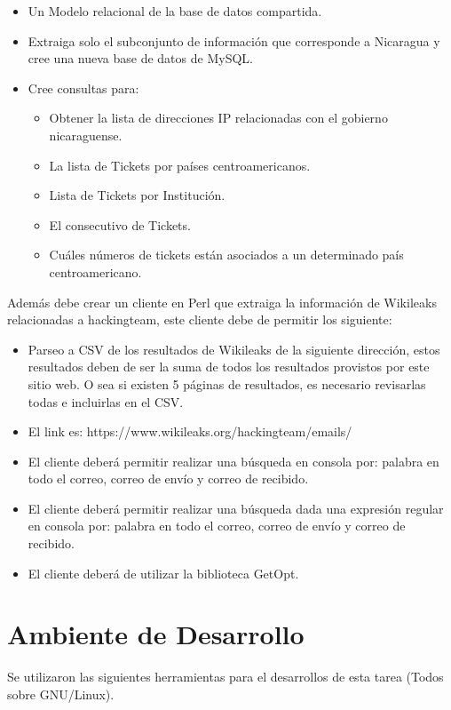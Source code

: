 \documentclass{article}
\begin{document}
\begin{itemize}
    \item Un Modelo relacional de la base de datos compartida.
    \item Extraiga solo el subconjunto de información que corresponde a Nicaragua y cree una nueva base de datos de MySQL.
    \item Cree consultas para:
    \begin{itemize}
        \item Obtener la lista de direcciones IP relacionadas con el gobierno nicaraguense.
        \item La lista de Tickets por países centroamericanos.
        \item Lista de Tickets por Institución.
        \item El consecutivo de Tickets.
        \item Cuáles números de tickets están asociados a un determinado país centroamericano.
    \end{itemize}
\end{itemize}
Además debe crear un cliente en Perl que extraiga la información de Wikileaks relacionadas a hackingteam, este cliente debe de permitir los siguiente:

\begin{itemize}
    \item Parseo a CSV de los resultados de Wikileaks de la siguiente dirección, estos resultados deben de ser la suma de todos los resultados provistos por este sitio web. O sea si existen 5 páginas de resultados, es necesario revisarlas todas e incluirlas en el CSV.
    \item El link es: https://www.wikileaks.org/hackingteam/emails/
    \item El cliente deberá permitir realizar una búsqueda en consola por: palabra en todo el correo, correo de envío y correo de recibido.
    \item El cliente deberá permitir realizar una búsqueda dada una expresión regular en consola por: palabra en todo el correo, correo de envío y correo de recibido.
    \item El cliente deberá de utilizar la biblioteca GetOpt.
\end{itemize}

\section{Ambiente de Desarrollo}
Se utilizaron las siguientes herramientas para el desarrollos de esta tarea (Todos sobre GNU/Linux).
\end{document}
